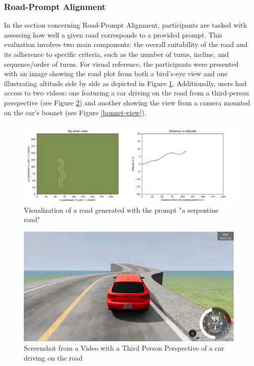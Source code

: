 \subsubsection{Road-Prompt Alignment}
In the section concerning Road-Prompt Alignment, participants are tasked with assessing how well a given road corresponds to a provided prompt. This evaluation involves two main components: the overall suitability of the road and its adherence to specific criteria, such as the number of turns, incline, and sequence/order of turns. For visual reference, the participants were presented with an image showing the road plot from both a bird's-eye view and one illustrating altitude side by side as depicted in Figure \ref{road_vis}. Additionally, users had access to two videos: one featuring a car driving on the road from a third-person perspective (see Figure \ref{third-person-view}) and another showing the view from a camera mounted on the car's bonnet (see Figure \ref{bonnet-view}).

\begin{figure}[H]
    \centering
    \includegraphics[width=1\linewidth]{images/road3.jpg}
    \caption{Visualization of a road generated with the prompt "a serpentine road"}
    \label{road_vis}
\end{figure}

\begin{figure}[H]
    \centering
    \includegraphics[width=0.5\linewidth]{images/Third_Person_View.jpg}
    \caption{Screenshot from a Video with a Third Person Perspective of a car driving on the road}
    \label{third-person-view}
\end{figure}

